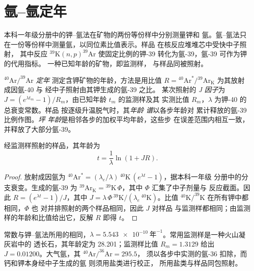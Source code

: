 \section{氩–氩定年}\label{sec:b3:advanced-geochronology:arar}

本科一年级分册中的钾–氩法在矿物的两份等份样中分别测量钾和
氩。氩–氩法只在一份等份样中测量氩，以同位素比值表示。样品
在核反应堆堆芯中受快中子照射，
其中反应 $^{39}\mathrm{K}(n,p)^{39}\mathrm{Ar}$ 使固定比例的钾-39
转化为氩-39，氩-39 可作为钾的代用指标。
一种已知年龄的矿物，即监测样，
与样品同被照射。

\begin{definition}
\label{def:b3:advanced-geochronology:arar}
\emph{$^{40}\mathrm{Ar}/^{39}\mathrm{Ar}$ 定年}
测定含钾矿物的年龄，方法是用比值 $R =
{}^{40}\mathrm{Ar}^*/{}^{39}\mathrm{Ar}_{\mathrm K}$ 为其放射成因氩-40 与
经中子照射由其钾生成的氩-39 之比。
某次照射的 \emph{J 因子}为 $J = (e^{\lambda
t_m} - 1)/R_m$，由已知年龄 $t_m$ 的监测样及其
实测比值 $R_m$，$\lambda$ 为钾-40 的总衰变常数。样品
按逐级升温脱气时，其\emph{年龄
谱}以各步年龄对
累计释放的氩-39 比例作图。\emph{坪
年龄}是相邻各步的加权平均年龄，这些步
在误差范围内相互一致，并释放了大部分氩-39。
\end{definition}

\begin{theorem}[氩–氩年龄]\label{thm:b3:advanced-geochronology:arar}
经监测样照射的样品，其年龄为
\[
t = \frac1\lambda\ln(1 + JR).
\]
\end{theorem}

\begin{proof}
放射成因氩为 $^{40}\mathrm{Ar}^* = (\lambda_e/\lambda)\,
{}^{40}\mathrm{K}\,(e^{\lambda t} - 1)$，据本科一年级
分册中的分支衰变。生成的氩-39 为 $^{39}\mathrm{Ar}_{\mathrm K} =
{}^{39}\mathrm{K}\,\Phi$，其中 $\Phi$ 汇集了中子剂量与
反应截面。因此 $R = (e^{\lambda t} - 1)/J$，其中 $J =
\lambda\,\Phi\,{}^{39}\mathrm{K}/(\lambda_e\,{}^{40}\mathrm{K})$。比值
$^{40}\mathrm{K}/^{39}\mathrm{K}$ 在所有钾中都相同，$\Phi$ 也
对并排照射的两个样品相同，因此 $J$ 对样品
与监测样都相同；由监测样的年龄和比值给出它，反解 $R$ 即得
$t$。
\end{proof}

常数与钾–氩法所用的相同，$\lambda =
\qty{5.543e-10}{\text{年}^{-1}}$。常用监测样是一种火山凝灰岩中的
透长石，其年龄定为 \qty{28.201}{\Ma}；监测样比值 $R_m = 1.3129$ 给出 $J =
0.01200$。大气氩，其 $^{40}\mathrm{Ar}/^{36}\mathrm{Ar} = 295.5$，
须以各步中实测的氩-36 扣除，而钙和钾本身经中子生成的氩
则须用盐类进行校正，
所用盐类与样品同包照射。


